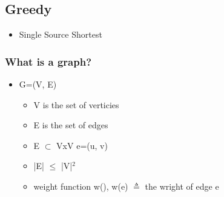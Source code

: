 \documentclass[11pt]{article}
\begin{document}
\subsection*{Greedy}
\label{sec:orga86788b}
\begin{itemize}
\item Single Source Shortest
\end{itemize}
\subsubsection*{What is a graph?}
\label{sec:org402f63e}
\begin{itemize}
\item G=(V, E)
\begin{itemize}
\item V is the set of verticies
\item E is the set of edges
\item E \(\subset\) VxV e=(u, v)
\item |E| \(\le\) |V|\(^{\text{2}}\)
\item weight function w(), w(e) \(\triangleq\) the wright of edge e
\end{itemize}
\end{itemize}
\end{document}
